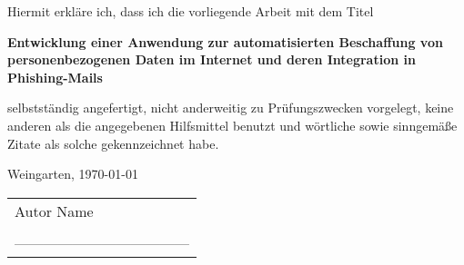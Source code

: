 
\thispagestyle{empty} %

Hiermit erkläre ich, dass ich die vorliegende Arbeit mit dem Titel   %
\begin{center}
\textbf{Entwicklung einer Anwendung zur automatisierten Beschaffung von personenbezogenen Daten im Internet und deren Integration in Phishing-Mails}
\end{center}
selbstständig angefertigt, nicht anderweitig zu Prüfungszwecken vorgelegt, keine anderen als die angegebenen Hilfsmittel benutzt und wörtliche sowie sinngemäße Zitate als solche gekennzeichnet habe.\newline  %

\begin{flushleft}
Weingarten, \today %
\end{flushleft}

\begin{tabular}{l}   
Autor Name        \\%
 \\
------------------------------------ \\
\end{tabular}




